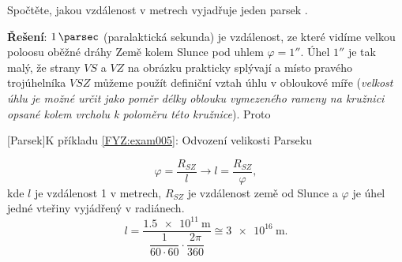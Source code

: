 \begin{mdframed}[style=mdexam]
  \begin{example}\label{FYZ:exam005}
    Spočtěte, jakou vzdálenost v metrech vyjadřuje jeden parsek \cite[s.~3]{Kulhanek2009}.
    
    \textbf{Řešení}: \(\SI{1}{\parsec}\) (paralaktická sekunda) je vzdálenost, ze které vidíme 
    velkou poloosu oběžné dráhy Země kolem Slunce pod uhlem \(\varphi = \ang{;;1}\). Úhel 
    \(\ang{;;1}\) je tak malý, že strany \(VS\) a \(VZ\) na obrázku prakticky splývají a místo 
    pravého trojúhelníka $VSZ$ můžeme použít definiční vztah úhlu v obloukové míře (\emph{velkost 
    úhlu je možné určit jako poměr délky oblouku vymezeného rameny na kružnici opsané kolem 
    vrcholu k poloměru této kružnice}). Proto 
    
    {\centering
      \captionsetup{type=figure}
      [Parsek]{K příkladu \ref{FYZ:exam005}: Odvození velikosti Parseku}
      \label{fyz:fig224}
      \par}
    \begin{equation*}
      \varphi = \frac{R_{SZ}}{l} \rightarrow l = \frac{R_{SZ}}{\varphi},
    \end{equation*}
    kde $l$ je vzdálenost \SI{1}{\parsec} v metrech, $R_{SZ}$ je vzdálenost země od Slunce a 
    $\varphi$ je úhel jedné vteřiny vyjádřený v radiánech. 
    \begin{equation*}
        l = \frac{\SI{1.5e11}{\meter}}{\dfrac{1}{60\cdot60} 
            \cdot\dfrac{2\pi}{360}}\cong \SI{3e16}{\meter}.
    \end{equation*}
  \end{example}
\end{mdframed}